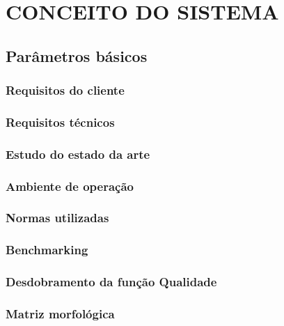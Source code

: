\chapter{CONCEITO DO SISTEMA}
\label{chap:conce}

\section{Parâmetros básicos}
\label{sec:basi}


\subsection{Requisitos do cliente}
\label{sub:reqc}


\subsection{Requisitos técnicos}
\label{sub:reqt}


\subsection{Estudo do estado da arte}
\label{sub:sota}


\subsection{Ambiente de operação}
\label{sub:ambiente}


\subsection{Normas utilizadas}
\label{sub:normas}


\subsection{Benchmarking}
\label{sub:bench}


\subsection{Desdobramento da função Qualidade}
\label{sub:qfd}


\subsection{Matriz morfológica}
\label{sub:matmorf}


